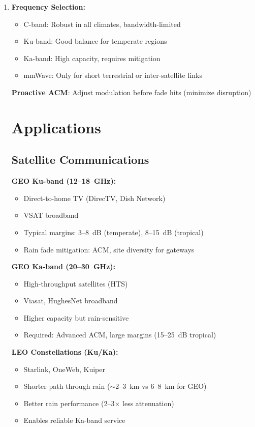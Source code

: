\begin{enumerate}
\item \textbf{Frequency Selection:}
  \begin{itemize}
  \item C-band: Robust in all climates, bandwidth-limited
  \item Ku-band: Good balance for temperate regions
  \item Ka-band: High capacity, requires mitigation
  \item mmWave: Only for short terrestrial or inter-satellite links
  \end{itemize}

\textbf{Proactive ACM}: Adjust modulation before fade hits (minimize disruption)

\section{Applications}

\subsection{Satellite Communications}

\textbf{GEO Ku-band (12--18~GHz):}
\begin{itemize}
\item Direct-to-home TV (DirecTV, Dish Network)
\item VSAT broadband
\item Typical margins: 3--8~dB (temperate), 8--15~dB (tropical)
\item Rain fade mitigation: ACM, site diversity for gateways
\end{itemize}

\textbf{GEO Ka-band (20--30~GHz):}
\begin{itemize}
\item High-throughput satellites (HTS)
\item Viasat, HughesNet broadband
\item Higher capacity but rain-sensitive
\item Required: Advanced ACM, large margins (15--25~dB tropical)
\end{itemize}

\textbf{LEO Constellations (Ku/Ka):}
\begin{itemize}
\item Starlink, OneWeb, Kuiper
\item Shorter path through rain ($\sim$2--3~km vs 6--8~km for GEO)
\item Better rain performance (2--3$\times$ less attenuation)
\item Enables reliable Ka-band service
\end{itemize}


\end{enumerate}
